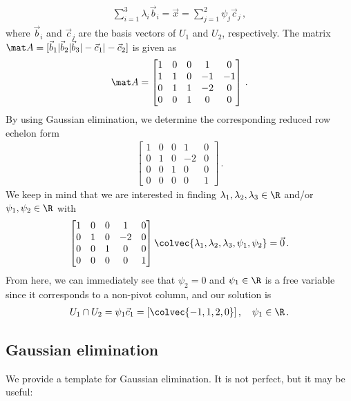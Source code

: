 \documentclass[12pt,twoside]{article}
\begin{document}
\begin{itemize}
		\begin{align}
		\sum_{i=1}^3 \lambda_i \vec b_i = \vec x = \sum_{j=1}^2 \psi_j \vec c_j\,,
		\end{align}
		where $\vec b_i$ and $\vec c_j$ are the basis vectors of $U_1$ and $U_2$, respectively.
		The matrix $\mat A = [\vec b_1|\vec b_2|\vec b_3| -\vec c_1|-\vec
		c_2]$ is given as
		\begin{align}
		\mat A = 
		\begin{bmatrix}
		1 & 0 & 0 & 1 & 0\\
		1 & 1 & 0 & -1 & -1\\
		0 & 1 & 1 & -2 & 0\\
		0 & 0 & 1 & 0 & 0
		\end{bmatrix}\,.
		\end{align}
		By using Gaussian elimination, we determine the corresponding reduced row echelon form 
		\begin{align}
		\begin{bmatrix}
		1 & 0 & 0 & 1& 0\\
		0 & 1 & 0 & -2 & 0\\
		0 & 0 & 1 & 0 & 0\\
		0 & 0 & 0 & 0 & 1
		\end{bmatrix}
		\,.
		\end{align}
		We keep in mind that we are interested in finding $\lambda_1,\lambda_2,\lambda_3\in\R$ and/or $\psi_1,\psi_2\in\R$ with 
		\begin{align}
		\begin{bmatrix}
		1 & 0 & 0 & 1& 0\\
		0 & 1 & 0 & -2 & 0\\
		0 & 0 & 1 & 0 & 0\\
		0 & 0 & 0 & 0 & 1
		\end{bmatrix}
		\colvec{\lambda_1, \lambda_2, \lambda_3, \psi_1, \psi_2}
		=\vec 0\,.
		\end{align}
		From here, we can immediately see that $\psi_2=0$ and $\psi_1\in\R$ is
		a free variable since it corresponds to a non-pivot column, and our solution is 
		\begin{align}
		U_1\cap U_2 = \psi_1\vec c_1 =  [ \colvec{-1,1,2,0} ]
		\,, \quad \psi_1\in\R\,.
		\end{align}
	\end{itemize}
	
	
	\subsection{Gaussian elimination}
	We provide a template for Gaussian elimination. It is not perfect, but it may be useful:
	
\end{document}
